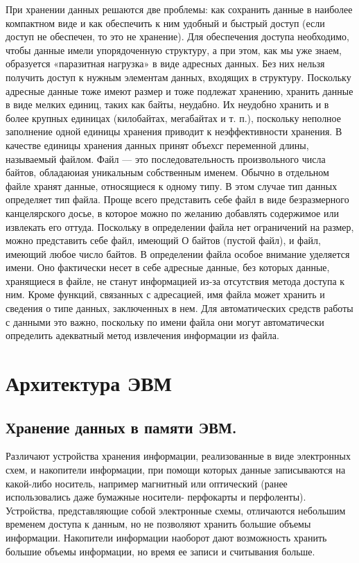 \documentclass[a4paper]{article}
\begin{document}
При хранении данных решаются две проблемы: как сохранить данные в наиболее компактном виде и как обеспечить к ним удобный и быстрый доступ (если доступ не обеспечен, то это не хранение). Для обеспечения доступа необходимо, чтобы данные имели упорядоченную структуру, а при этом, как мы уже знаем, образуется «паразитная нагрузка» в виде адресных данных. Без них нельзя получить доступ к нужным элементам данных, входящих в структуру. Поскольку адресные данные тоже имеют размер и тоже подлежат хранению, хранить данные в виде мелких единиц, таких как байты, неудабно. Их неудобно хранить и в более крупных единицах (килобайтах, мегабайтах и т. п.), поскольку неполное заполнение одной единицы хранения приводит к неэффективности хранения. В качестве единицы хранения данных принят объехсг переменной длины, называемый файлом. Файл — это последовательность произвольного числа байтов, обладаюиая уникальным собственным именем. Обычно в отдельном файле хранят данные, относящиеся к одному типу. В этом случае тип данных определяет тип файла. Проще всего представить себе файл в виде безразмерного канцелярского досье, в которое можно по желанию добавлять содержимое или извлекать его оттуда. Поскольку в определении файла нет ограничений на размер, можно представить себе файл, имеющий О байтов (пустой файл), и файл, имеющий любое число байтов. В определении файла особое внимание уделяется имени. Оно фактически несет в себе адресные данные, без которых данные, хранящиеся в файле, не станут информацией из-за отсутствия метода доступа к ним. Кроме функций, связанных с адресацией, имя файла может хранить и сведения о типе данных, заключенных в нем. Для автоматических средств работы с данными это важно, поскольку по имени файла они могут автоматически определить адекватный метод извлечения информации из файла.

\section{Архитектура ЭВМ}

\subsection{Хранение данных в памяти ЭВМ.}

Различают устройства хранения информации, реализованные в виде электронных схем, и накопители информации, при помощи которых данные записываются на какой-либо носитель, например магнитный или оптический (ранее использовались даже бумажные носители- перфокарты и перфоленты). Устройства, представляющие собой электронные схемы, отличаются небольшим временем доступа к данным, но не позволяют хранить большие объемы информации. Накопители информации наоборот дают возможность хранить большие объемы информации, но время ее записи и считывания больше.
\end{document}
